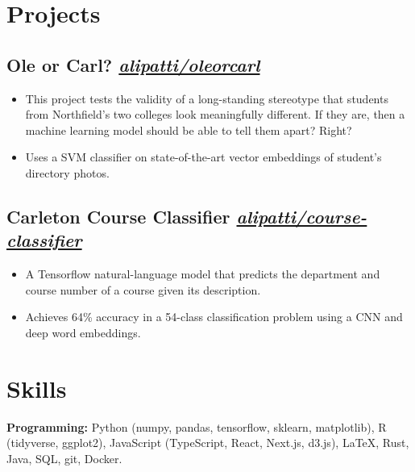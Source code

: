 \documentclass{ali-resume}
\begin{document}
\null %

\section{Projects}

\newcommand{\project}[2]{%
	\subsection{#1
		\hfill
		\normalfont \small \faicon{github}
		\href{http://github.com/alipatti/#2}{\textit{alipatti/#2}}
	}}

\project{Ole or Carl?}{oleorcarl}

\begin{itemize}
	\item This project tests the validity of a long-standing stereotype that students from Northfield's two colleges look meaningfully different. If they are, then a machine learning model should be able to tell them apart? Right?
	\item Uses a SVM classifier on state-of-the-art vector embeddings of student's directory photos.
\end{itemize}

\project{Carleton Course Classifier}{course-classifier}

\begin{itemize}
	\item A Tensorflow natural-language model that predicts the department and course number of a course given its description. \item Achieves 64\% accuracy in a 54-class classification problem using a CNN and deep word embeddings.
\end{itemize}

\section{Skills}

\textbf{Programming:}
Python (numpy, pandas, tensorflow, sklearn, matplotlib), R (tidyverse, ggplot2), JavaScript (TypeScript, React, Next.js, d3.js), \LaTeX, Rust, Java, SQL, git, Docker.
\end{document}
